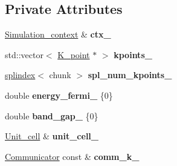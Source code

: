 \subsection*{Private Attributes}
\begin{DoxyCompactItemize}
\item 
\hypertarget{classsirius_1_1_k__point__set_aa38d3463aa2ee307ec899e3ad5e716b1}{}\hyperlink{classsirius_1_1_simulation__context}{Simulation\+\_\+context} \& {\bfseries ctx\+\_\+}\label{classsirius_1_1_k__point__set_aa38d3463aa2ee307ec899e3ad5e716b1}

\item 
\hypertarget{classsirius_1_1_k__point__set_a0c8ff279eeca613e6ecf175044e1b302}{}std\+::vector$<$ \hyperlink{classsirius_1_1_k__point}{K\+\_\+point} $\ast$ $>$ {\bfseries kpoints\+\_\+}\label{classsirius_1_1_k__point__set_a0c8ff279eeca613e6ecf175044e1b302}

\item 
\hypertarget{classsirius_1_1_k__point__set_a12a30147a9df930203250cbfe1ecabd0}{}\hyperlink{classsddk_1_1splindex}{splindex}$<$ chunk $>$ {\bfseries spl\+\_\+num\+\_\+kpoints\+\_\+}\label{classsirius_1_1_k__point__set_a12a30147a9df930203250cbfe1ecabd0}

\item 
\hypertarget{classsirius_1_1_k__point__set_a1db0a6a6c873cc089e9c871940b4221a}{}double {\bfseries energy\+\_\+fermi\+\_\+} \{0\}\label{classsirius_1_1_k__point__set_a1db0a6a6c873cc089e9c871940b4221a}

\item 
\hypertarget{classsirius_1_1_k__point__set_adc07972a44349d63718f953e1dfa1484}{}double {\bfseries band\+\_\+gap\+\_\+} \{0\}\label{classsirius_1_1_k__point__set_adc07972a44349d63718f953e1dfa1484}

\item 
\hypertarget{classsirius_1_1_k__point__set_ad9c424bb8871bccf4c48ee37d7aae73a}{}\hyperlink{classsirius_1_1_unit__cell}{Unit\+\_\+cell} \& {\bfseries unit\+\_\+cell\+\_\+}\label{classsirius_1_1_k__point__set_ad9c424bb8871bccf4c48ee37d7aae73a}

\item 
\hypertarget{classsirius_1_1_k__point__set_a955e4c58046f64adaec8b8c4c1a9a35d}{}\hyperlink{classsddk_1_1_communicator}{Communicator} const \& {\bfseries comm\+\_\+k\+\_\+}\label{classsirius_1_1_k__point__set_a955e4c58046f64adaec8b8c4c1a9a35d}

\end{DoxyCompactItemize}


